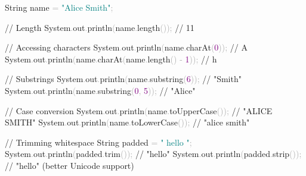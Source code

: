 \documentclass[
  justified,
  openright,
]{tufte-book}
\newcommand{\BuiltInTok}[1]{#1}
\newcommand{\CommentTok}[1]{\textcolor{MidGray}{#1}}
\newcommand{\DecValTok}[1]{\textcolor{Purple}{#1}}
\newcommand{\FunctionTok}[1]{\textcolor{BrandBlue}{#1}}
\newcommand{\NormalTok}[1]{#1}
\newcommand{\OperatorTok}[1]{\textcolor{DarkGray}{#1}}
\newcommand{\StringTok}[1]{\textcolor{Teal}{#1}}
\newenvironment{Shaded}{%
  \begin{snugshade}
}{%
  \end{snugshade}
}
\begin{document}
\begin{Shaded}
\begin{Highlighting}[]
\BuiltInTok{String}\NormalTok{ name }\OperatorTok{=} \StringTok{"Alice Smith"}\OperatorTok{;}

\CommentTok{// Length}
\BuiltInTok{System}\OperatorTok{.}\FunctionTok{out}\OperatorTok{.}\FunctionTok{println}\OperatorTok{(}\NormalTok{name}\OperatorTok{.}\FunctionTok{length}\OperatorTok{());}           \CommentTok{// 11}

\CommentTok{// Accessing characters}
\BuiltInTok{System}\OperatorTok{.}\FunctionTok{out}\OperatorTok{.}\FunctionTok{println}\OperatorTok{(}\NormalTok{name}\OperatorTok{.}\FunctionTok{charAt}\OperatorTok{(}\DecValTok{0}\OperatorTok{));}          \CommentTok{// \textquotesingle{}A\textquotesingle{}}
\BuiltInTok{System}\OperatorTok{.}\FunctionTok{out}\OperatorTok{.}\FunctionTok{println}\OperatorTok{(}\NormalTok{name}\OperatorTok{.}\FunctionTok{charAt}\OperatorTok{(}\NormalTok{name}\OperatorTok{.}\FunctionTok{length}\OperatorTok{()} \OperatorTok{{-}} \DecValTok{1}\OperatorTok{));}  \CommentTok{// \textquotesingle{}h\textquotesingle{}}

\CommentTok{// Substrings}
\BuiltInTok{System}\OperatorTok{.}\FunctionTok{out}\OperatorTok{.}\FunctionTok{println}\OperatorTok{(}\NormalTok{name}\OperatorTok{.}\FunctionTok{substring}\OperatorTok{(}\DecValTok{6}\OperatorTok{));}       \CommentTok{// "Smith"}
\BuiltInTok{System}\OperatorTok{.}\FunctionTok{out}\OperatorTok{.}\FunctionTok{println}\OperatorTok{(}\NormalTok{name}\OperatorTok{.}\FunctionTok{substring}\OperatorTok{(}\DecValTok{0}\OperatorTok{,} \DecValTok{5}\OperatorTok{));}    \CommentTok{// "Alice"}

\CommentTok{// Case conversion}
\BuiltInTok{System}\OperatorTok{.}\FunctionTok{out}\OperatorTok{.}\FunctionTok{println}\OperatorTok{(}\NormalTok{name}\OperatorTok{.}\FunctionTok{toUpperCase}\OperatorTok{());}      \CommentTok{// "ALICE SMITH"}
\BuiltInTok{System}\OperatorTok{.}\FunctionTok{out}\OperatorTok{.}\FunctionTok{println}\OperatorTok{(}\NormalTok{name}\OperatorTok{.}\FunctionTok{toLowerCase}\OperatorTok{());}      \CommentTok{// "alice smith"}

\CommentTok{// Trimming whitespace}
\BuiltInTok{String}\NormalTok{ padded }\OperatorTok{=} \StringTok{"  hello  "}\OperatorTok{;}
\BuiltInTok{System}\OperatorTok{.}\FunctionTok{out}\OperatorTok{.}\FunctionTok{println}\OperatorTok{(}\NormalTok{padded}\OperatorTok{.}\FunctionTok{trim}\OperatorTok{());}           \CommentTok{// "hello"}
\BuiltInTok{System}\OperatorTok{.}\FunctionTok{out}\OperatorTok{.}\FunctionTok{println}\OperatorTok{(}\NormalTok{padded}\OperatorTok{.}\FunctionTok{strip}\OperatorTok{());}          \CommentTok{// "hello" (better Unicode support)}


\end{Highlighting}
\end{Shaded}
\end{document}
